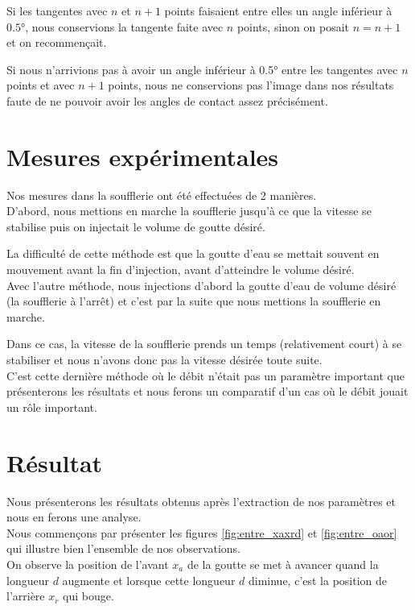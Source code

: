 \documentclass[french]{article}
\begin{document}
Si les tangentes avec $n$ et $n+1$ points faisaient entre elles un angle inférieur à $\ang{0.5}$, nous conservions la tangente faite avec $n$ points, sinon on posait $n = n+1$ et on recommençait.

Si nous n'arrivions pas à avoir un angle inférieur à \ang{0.5}  entre les tangentes avec $n$ points et avec $n+1$ points, nous ne conservions pas l'image dans nos résultats faute de ne pouvoir avoir les angles de contact assez précisément.

\section{Mesures expérimentales}

Nos mesures dans la soufflerie ont été effectuées de 2 manières.\\

D'abord, nous mettions en marche la soufflerie jusqu'à ce que la vitesse se stabilise puis on injectait le volume de goutte désiré.

La difficulté de cette méthode est que la goutte d'eau se mettait souvent en mouvement avant la fin d'injection, avant d'atteindre le volume désiré.\\

Avec l'autre méthode, nous injections d'abord la goutte d'eau de volume désiré (la soufflerie à l'arrêt) et c'est par la suite que nous mettions la soufflerie en marche.

Dans ce cas, la vitesse de la soufflerie prends un temps (relativement court) à se stabiliser et nous n'avons donc pas la vitesse désirée toute suite.\\

C'est cette dernière méthode où le débit n'était pas un paramètre important que présenterons les résultats et nous ferons un comparatif d'un cas où le débit jouait un rôle important.
\newpage
\section{Résultat}

Nous présenterons les résultats obtenus après l'extraction de nos paramètres et nous en ferons une analyse.\\
Nous commençons par présenter les figures \ref{fig:entre_xaxrd} et \ref{fig:entre_oaor} qui illustre bien l'ensemble de nos observations.\\

On observe la position de l'avant $x_{a}$ de la goutte se met à avancer quand la longueur $d$ augmente et lorsque cette longueur $d$ diminue, c'est la position de l'arrière $x_{r}$ qui bouge.
\end{document}
